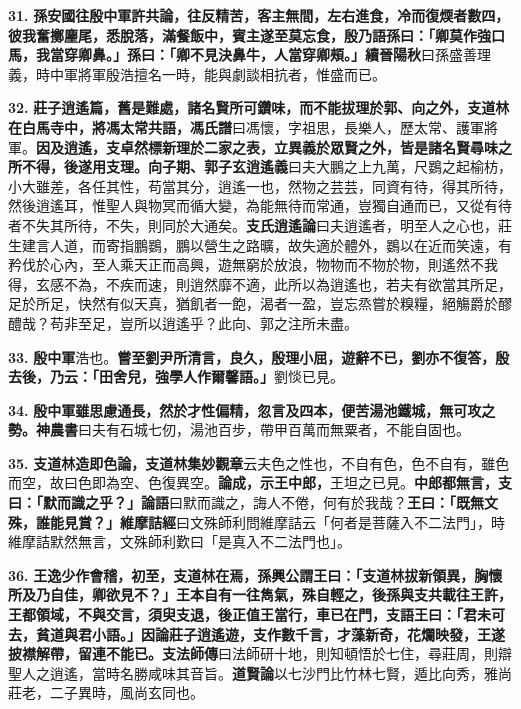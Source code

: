 \textbf{31.} \textbf{孫安國往殷中軍許共論，往反精苦，客主無間，左右進食，冷而復煗者數四，彼我奮擲麈尾，悉脫落，滿餐飯中，賓主遂至莫忘食，殷乃語孫曰：「卿莫作強口馬，我當穿卿鼻。」孫曰：「卿不見決鼻牛，人當穿卿頰。」}{\footnotesize \textbf{續晉陽秋}曰孫盛善理義，時中軍將軍殷浩擅名一時，能與劇談相抗者，惟盛而已。}

\textbf{32.} \textbf{莊子逍遙篇，舊是難處，諸名賢所可鑽味，而不能拔理於郭、向之外，支道林在白馬寺中，將馮太常共語，}{\footnotesize \textbf{馮氏譜}曰馮懷，字祖思，長樂人，歷太常、護軍將軍。}\textbf{因及逍遙，支卓然標新理於二家之表，立異義於眾賢之外，皆是諸名賢尋味之所不得，後遂用支理。}{\footnotesize \textbf{向子期、郭子玄逍遙義}曰夫大鵬之上九萬，尺鷃之起榆枋，小大雖差，各任其性，苟當其分，逍遙一也，然物之芸芸，同資有待，得其所待，然後逍遙耳，惟聖人與物冥而循大變，為能無待而常通，豈獨自通而已，又從有待者不失其所待，不失，則同於大通矣。\textbf{支氏逍遙論}曰夫逍遙者，明至人之心也，莊生建言人道，而寄指鵬鷃，鵬以營生之路曠，故失適於體外，鷃以在近而笑遠，有矜伐於心內，至人乘天正而高興，遊無窮於放浪，物物而不物於物，則遙然不我得，玄感不為，不疾而速，則逍然靡不適，此所以為逍遙也，若夫有欲當其所足，足於所足，快然有似天真，猶飢者一飽，渴者一盈，豈忘烝嘗於糗糧，絕觴爵於醪醴哉？苟非至足，豈所以逍遙乎？此向、郭之注所未盡。}

\textbf{33.} \textbf{殷中軍}{\footnotesize 浩也。}\textbf{嘗至劉尹所清言，良久，殷理小屈，遊辭不已，劉亦不復答，殷去後，乃云：「田舍兒，強學人作爾馨語。」}{\footnotesize 劉惔已見。}

\textbf{34.} \textbf{殷中軍雖思慮通長，然於才性偏精，忽言及四本，便苦湯池鐵城，無可攻之勢。}{\footnotesize \textbf{神農書}曰夫有石城七仞，湯池百步，帶甲百萬而無粟者，不能自固也。}

\textbf{35.} \textbf{支道林造即色論，}{\footnotesize \textbf{支道林集妙觀章}云夫色之性也，不自有色，色不自有，雖色而空，故曰色即為空、色復異空。}\textbf{論成，示王中郎，}{\footnotesize 王坦之已見。}\textbf{中郎都無言，支曰：「默而識之乎？」}{\footnotesize \textbf{論語}曰默而識之，誨人不倦，何有於我哉？}\textbf{王曰：「既無文殊，誰能見賞？」}{\footnotesize \textbf{維摩詰經}曰文殊師利問維摩詰云「何者是菩薩入不二法門」，時維摩詰默然無言，文殊師利歎曰「是真入不二法門也」。}

\textbf{36.} \textbf{王逸少作會稽，初至，支道林在焉，孫興公謂王曰：「支道林拔新領異，胸懷所及乃自佳，卿欲見不？」王本自有一往雋氣，殊自輕之，後孫與支共載往王許，王都領域，不與交言，須臾支退，後正值王當行，車已在門，支語王曰：「君未可去，貧道與君小語。」因論莊子逍遙遊，支作數千言，才藻新奇，花爛映發，王遂披襟解帶，留連不能已。}{\footnotesize \textbf{支法師傳}曰法師研十地，則知頓悟於七住，尋莊周，則辯聖人之逍遙，當時名勝咸味其音旨。\textbf{道賢論}以七沙門比竹林七賢，遁比向秀，雅尚莊老，二子異時，風尚玄同也。}

